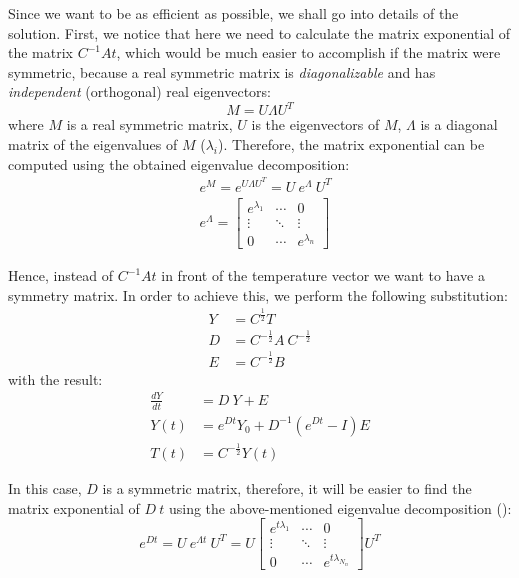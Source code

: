 Since we want to be as efficient as possible, we shall go into details of the solution. First, we notice that here we need to calculate the matrix exponential of the matrix $C^{-1} A t$, which would be much easier to accomplish if the matrix were symmetric, because a real symmetric matrix is \emph{diagonalizable} and has \emph{independent} (orthogonal) real eigenvectors:
\begin{equation} \label{eq:eigenvalue-decomposition}
  M = U \Lambda U^T
\end{equation}
where $M$ is a real symmetric matrix, $U$ is the eigenvectors of $M$, $\Lambda$ is a diagonal matrix of the eigenvalues of $M$ ($\lambda_i$). Therefore, the matrix exponential can be computed using the obtained eigenvalue decomposition:
\begin{align}
  & e^M = e^{U \Lambda U^T} = U \: e^{\Lambda} \: U^T \nonumber \\
  & e^{\Lambda} = \left[
      \begin{array}{ccc}
        e^{\lambda_1} & \cdots & 0 \\
        \vdots & \ddots & \vdots \\
        0 & \cdots & e^{\lambda_{n}}
      \end{array}
    \right] \nonumber
\end{align}

Hence, instead of $C^{-1} A t$ in front of the temperature vector we want to have a symmetry matrix. In order to achieve this, we perform the following substitution:
\begin{align*}
  Y & = C^{\frac{1}{2}} T \\
  D & = C^{-\frac{1}{2}} A \: C^{-\frac{1}{2}} \\
  E & = C^{-\frac{1}{2}} B
\end{align*}
with the result:
\begin{align}
  \frac{dY}{dt} & = D \: Y + E \nonumber \\
  Y(t) & = e^{D t} Y_0 + D^{-1} (e^{D t} - I) E \label{eq:modified-solution} \\
  T(t) & = C^{-\frac{1}{2}} Y(t) \nonumber
\end{align}

In this case, $D$ is a symmetric matrix, therefore, it will be easier to find the matrix exponential of $D \: t$ using the above-mentioned eigenvalue decomposition ():
\[
  e^{D t} = U \: e^{\Lambda t} \: U^T = U \left[
      \begin{array}{ccc}
        e^{t \lambda_1} & \cdots & 0 \\
        \vdots & \ddots & \vdots \\
        0 & \cdots & e^{t \lambda_{N_n}}
      \end{array}
    \right] U^T
\]

